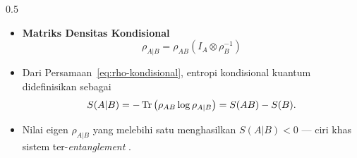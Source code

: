 \begin{frame}
\begin{columns}[T]
        \begin{column}{0.5\textwidth}
            \begin{itemize}\tiny\justifying
                \item \textbf{Matriks Densitas Kondisional}
                    \begin{equation}
                        \rho_{A|B}=\rho_{AB}\left(I_A\otimes\rho_B^{-1}\right)
                        \label{eq:rho-kondisional}
                    \end{equation}
                    \item[$\Rightarrow$] Dari Persamaan~\ref{eq:rho-kondisional},
                        entropi kondisional kuantum didefinisikan sebagai
                    \begin{equation}
                        S(A|B)=-\operatorname{Tr}\left(\rho_{AB}\log\rho_{A|B}\right)
                        = S(AB)-S(B).
                    \end{equation}
                    \item[$\Rightarrow$] Nilai eigen $\rho_{A|B}$ yang melebihi satu
                        menghasilkan $S(A|B)<0$ --- ciri khas sistem
                        ter-\textit{entanglement} \cite{cerf1997negative}.
            \end{itemize}
        \end{column}
    \end{columns}
\end{frame}

